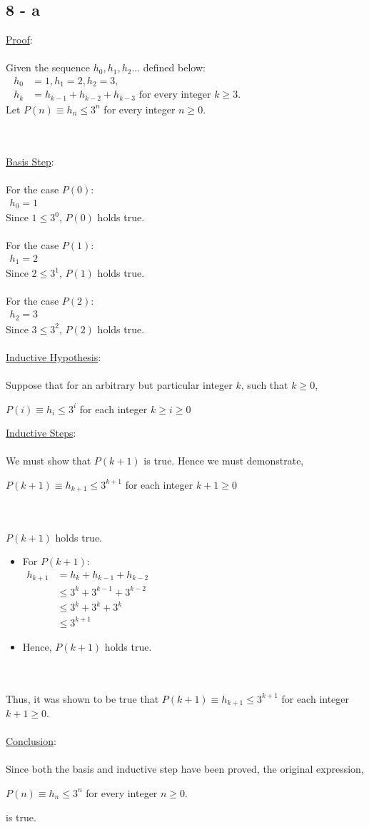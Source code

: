\documentclass[12pt]{article}
\newcommand{\xlist}[1]{
    \begin{itemize}
        \renewcommand{\labelitemi}{$\centerdot$}
        #1
    \end{itemize}
    \newblock
    \\ \\
}
\newcommand{\xconclusion}[1]{
    \underline{Conclusion}:
    \\ \\
    #1
    \\ \\
}
\newcommand{\xproof}[1]{
    \underline{Proof}:
    \\ \\
    #1
    \\ \\
}
\newcommand{\xbasisstep}{
    \underline{Basis Step}:
    \\ \\
}
\newcommand{\xinductivehypothesis}{
    \underline{Inductive Hypothesis}:
    \\ \\
}
\newcommand{\xinductivestep}{
    \underline{Inductive Steps}:
    \\ \\
}
\begin{document}
\subsection*{8 - a}
\xproof{
    Given the sequence $h_0, h_1, h_2$... defined below:
    \begin{align*}
        h_0 &= 1, h_1 = 2, h_2 = 3, \hspace{10cm} \\
        h_k &= h_{k-1}+h_{k-2}+h_{k-3}\text{ for every integer } k \geq 3.
    \end{align*}
    Let $P(n) \equiv h_n \leq 3^n $ for every integer $n \geq 0$.
}
\xbasisstep
For the case $P(0)$:
\begin{align*}
    h_0 = 1 \hspace{14cm}
\end{align*}
Since $1 \leq 3^0$, $P(0)$ holds true.
\\ \\
For the case $P(1)$:
\begin{align*}
    h_1 = 2 \hspace{14cm}
\end{align*}
Since $2 \leq 3^1$, $P(1)$ holds true.
\\ \\
For the case $P(2)$:
\begin{align*}
    h_2 = 3 \hspace{14cm}
\end{align*}
Since $3 \leq 3^2$, $P(2)$ holds true.
\\ \\
\xinductivehypothesis
Suppose that for an arbitrary but particular integer $k$, such that $k \geq 0$,
\begin{center}
    $P(i) \equiv h_i \leq 3^i $ for each integer $k \geq i \geq 0$
\end{center}
\xinductivestep
We must show that $P(k+1)$ is true. Hence we must demonstrate,
\begin{center}
    $P(k+1) \equiv h_{k+1} \leq 3^{k+1}$ for each integer $k + 1 \geq 0$
\end{center}
\newblock
\\ \\
$P(k+1)$ holds true.
\xlist{
    \item For $P(k+1)$:
    \begin{align*}
        h_{k+1} &= h_{k}+h_{k-1}+h_{k-2} \hspace{9cm} \\
        &\leq 3^{k}+ 3^{k-1} + 3^{k-2} \\
        &\leq 3^k+3^k+3^k \\
        &\leq 3^{k+1}
    \end{align*}
    \item Hence, $P(k+1)$ holds true.
}
Thus, it was shown to be true that $P(k+1) \equiv h_{k+1} \leq 3^{k+1}$ for each integer $k + 1 \geq 0$.
\\ \\
\xconclusion{
    Since both the basis and inductive step have been proved, the original expression,
    \begin{center}
        $P(n) \equiv h_n \leq 3^n $ for every integer $n \geq 0$.
    \end{center}
    is true.
}
\end{document}
